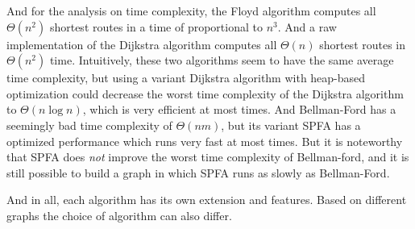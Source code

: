 \documentclass[a4paper,11pt,twocolumn]{article}
\begin{document}
And for the analysis on time complexity, the Floyd algorithm computes all $\Theta(n^2)$ shortest routes in a time of proportional to $n^3$. And a raw implementation of the Dijkstra algorithm computes all $\Theta(n)$ shortest routes in $\Theta(n^2)$ time. Intuitively, these two algorithms seem to have the same average time complexity, but using a variant Dijkstra algorithm with heap-based optimization could decrease the worst time complexity of the Dijkstra algorithm to $\Theta(n\log n)$, which is very efficient at most times. And Bellman-Ford has a seemingly bad time complexity of $\Theta(nm)$, but its variant SPFA has a optimized performance which runs very fast at most times. But it is noteworthy that SPFA does \emph{not} improve the worst time complexity of Bellman-ford, and it is still possible to build a graph in which SPFA runs as slowly as Bellman-Ford. 

And in all, each algorithm has its own extension and features. Based on different graphs the choice of algorithm can also differ. 
\end{document}
